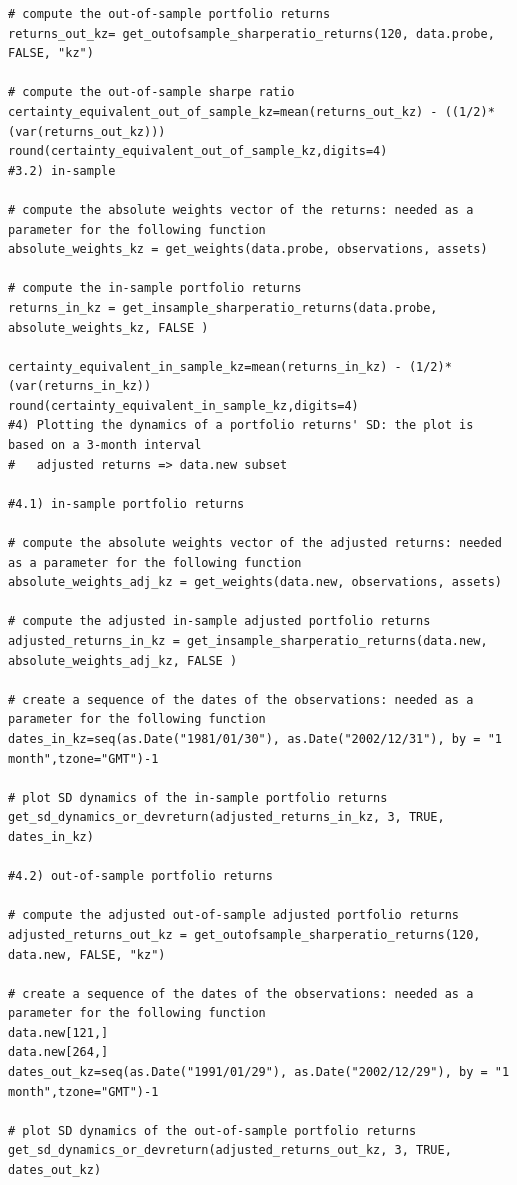 \documentclass{article}
\begin{document}
\begin{lstlisting}[caption={This listing shows the entire code developed in R.}, label=code:1,frame=single]
# compute the out-of-sample portfolio returns
returns_out_kz= get_outofsample_sharperatio_returns(120, data.probe, FALSE, "kz")

# compute the out-of-sample sharpe ratio
certainty_equivalent_out_of_sample_kz=mean(returns_out_kz) - ((1/2)*(var(returns_out_kz)))
round(certainty_equivalent_out_of_sample_kz,digits=4)
#3.2) in-sample

# compute the absolute weights vector of the returns: needed as a parameter for the following function
absolute_weights_kz = get_weights(data.probe, observations, assets)

# compute the in-sample portfolio returns
returns_in_kz = get_insample_sharperatio_returns(data.probe, absolute_weights_kz, FALSE )

certainty_equivalent_in_sample_kz=mean(returns_in_kz) - (1/2)*(var(returns_in_kz))
round(certainty_equivalent_in_sample_kz,digits=4)
#4) Plotting the dynamics of a portfolio returns' SD: the plot is based on a 3-month interval 
#   adjusted returns => data.new subset

#4.1) in-sample portfolio returns

# compute the absolute weights vector of the adjusted returns: needed as a parameter for the following function
absolute_weights_adj_kz = get_weights(data.new, observations, assets)

# compute the adjusted in-sample adjusted portfolio returns 
adjusted_returns_in_kz = get_insample_sharperatio_returns(data.new, absolute_weights_adj_kz, FALSE )

# create a sequence of the dates of the observations: needed as a parameter for the following function
dates_in_kz=seq(as.Date("1981/01/30"), as.Date("2002/12/31"), by = "1 month",tzone="GMT")-1

# plot SD dynamics of the in-sample portfolio returns
get_sd_dynamics_or_devreturn(adjusted_returns_in_kz, 3, TRUE, dates_in_kz)

#4.2) out-of-sample portfolio returns

# compute the adjusted out-of-sample adjusted portfolio returns
adjusted_returns_out_kz = get_outofsample_sharperatio_returns(120, data.new, FALSE, "kz")

# create a sequence of the dates of the observations: needed as a parameter for the following function
data.new[121,]
data.new[264,]
dates_out_kz=seq(as.Date("1991/01/29"), as.Date("2002/12/29"), by = "1 month",tzone="GMT")-1

# plot SD dynamics of the out-of-sample portfolio returns
get_sd_dynamics_or_devreturn(adjusted_returns_out_kz, 3, TRUE, dates_out_kz)


\end{lstlisting}
\end{document}
